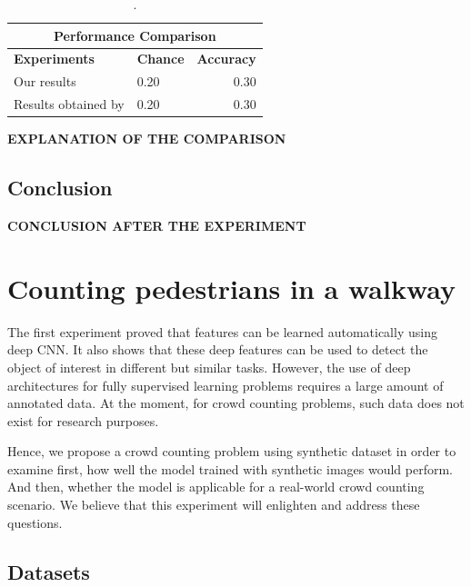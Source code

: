 \begin{table}[H]
\centering
\small\sffamily
\begin{tabular}{llr}
\multicolumn{3}{c}{\textbf{\textbf{Performance Comparison}}} \\
\bottomrule
\textbf{Experiments}  & \textbf{Chance} & \textbf{Accuracy} \\
\bottomrule
Our results           & 0.20 & 0.30 \\
Results obtained by \citeauthor*{segui2015learning}       & 0.20 & 0.30 \\

\bottomrule
\end{tabular}
\caption{.}
\label{tab:comp}
\end{table} 

\textbf{EXPLANATION OF THE COMPARISON}

\subsection{Conclusion}

\textbf{CONCLUSION AFTER THE EXPERIMENT} 

\section{Counting pedestrians in a walkway}

The first experiment proved that features can be learned automatically using deep CNN. It also shows that these deep features can be used to detect the object of interest in different but similar tasks. However, the use of deep architectures for fully supervised learning problems requires a large amount of annotated data. At the moment, for crowd counting problems, such data does not exist for research purposes. 

Hence, we propose a crowd counting problem using synthetic dataset in order to examine first, how well the model trained with synthetic images would perform. And then, whether the model is applicable for a real-world crowd counting scenario. We believe that this experiment will enlighten and address these questions. 

\subsection{Datasets} 

